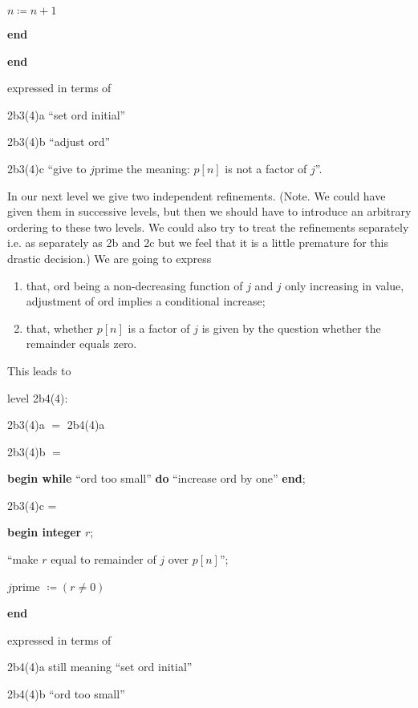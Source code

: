 \noindent
\quad\quad\quad $n \coloneq n + 1$

\noindent
\quad\textbf{end}

\noindent
\textbf{end}

\noindent
expressed in terms of

\noindent
2b3(4)a\tabto{5em} ``set ord initial''

\noindent
2b3(4)b\tabto{5em} ``adjust ord''

\noindent
2b3(4)c\tabto{5em} ``give to $j$prime the meaning: $p[n]$ is not a factor of $j$''. 

In our next level we give two independent refinements. (Note. We could have given them in successive levels, but then we should have to introduce an arbitrary ordering to these two levels. We could also try to treat the refinements separately \textemdash{}  i.e. as separately as 2b and 2c \textemdash{}  but we feel that it is a little premature for this drastic decision.) We are going to express

\begin{enumerate}[leftmargin=2\parindent, label=(\arabic*)]
	\item that, ord being a non-decreasing function of $j$ and $j$ only increasing in value, adjustment of ord implies a conditional increase;

	\item that, whether $p[n]$ is a factor of $j$ is given by the question whether the remainder equals zero.
\end{enumerate}

\noindent
This leads to

\noindent
level 2b4(4):

\noindent
2b3(4)a $=$ 2b4(4)a

\noindent
2b3(4)b $=$

\noindent
\textbf{begin while} ``ord too small'' \textbf{do} ``increase ord by one'' \textbf{end};

\noindent
2b3(4)c =

\noindent
\textbf{begin integer} $r$;

\noindent
\quad ``make $r$ equal to remainder of $j$ over $p[n]$'';

\noindent
\quad $j$prime $\coloneq (r \neq 0)$

\noindent
\textbf{end}

\noindent
expressed in terms of

\noindent
2b4(4)a\tabto{5em} still meaning ``set ord initial''

\noindent
2b4(4)b\tabto{5em} ``ord too small''

